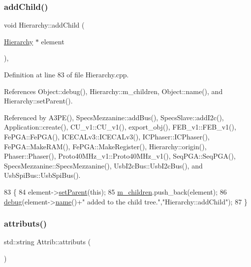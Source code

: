 \subsubsection{\texorpdfstring{add\+Child()}{addChild()}}
{\footnotesize\ttfamily void Hierarchy\+::add\+Child (\begin{DoxyParamCaption}\item[{\hyperlink{classHierarchy}{Hierarchy} $\ast$}]{element }\end{DoxyParamCaption})\hspace{0.3cm}{\ttfamily [virtual]}, {\ttfamily [inherited]}}



Definition at line 83 of file Hierarchy.\+cpp.



References Object\+::debug(), Hierarchy\+::m\+\_\+children, Object\+::name(), and Hierarchy\+::set\+Parent().



Referenced by A3\+P\+E(), Specs\+Mezzanine\+::add\+Bus(), Specs\+Slave\+::add\+I2c(), Application\+::create(), C\+U\+\_\+v1\+::\+C\+U\+\_\+v1(), export\+\_\+obj(), F\+E\+B\+\_\+v1\+::\+F\+E\+B\+\_\+v1(), Fe\+P\+G\+A\+::\+Fe\+P\+G\+A(), I\+C\+E\+C\+A\+Lv3\+::\+I\+C\+E\+C\+A\+Lv3(), I\+C\+Phaser\+::\+I\+C\+Phaser(), Fe\+P\+G\+A\+::\+Make\+R\+A\+M(), Fe\+P\+G\+A\+::\+Make\+Register(), Hierarchy\+::origin(), Phaser\+::\+Phaser(), Proto40\+M\+Hz\+\_\+v1\+::\+Proto40\+M\+Hz\+\_\+v1(), Seq\+P\+G\+A\+::\+Seq\+P\+G\+A(), Specs\+Mezzanine\+::\+Specs\+Mezzanine(), Usb\+I2c\+Bus\+::\+Usb\+I2c\+Bus(), and Usb\+Spi\+Bus\+::\+Usb\+Spi\+Bus().


\begin{DoxyCode}
83                                           \{
84   element->\hyperlink{classHierarchy_a585ad1aeec16077a0e532ab8b4fc557b}{setParent}(\textcolor{keyword}{this});
85   \hyperlink{classHierarchy_a038816763941fd4a930504917f60483b}{m\_children}.push\_back(element);
86   \hyperlink{classObject_aac010553f022165573714b7014a15f0d}{debug}(element->\hyperlink{classObject_a300f4c05dd468c7bb8b3c968868443c1}{name}()+\textcolor{stringliteral}{" added to the child tree."},\textcolor{stringliteral}{"Hierarchy::addChild"});
87 \}
\end{DoxyCode}
\mbox{\label{classAttrib_aee7bbf16b144887f196e1341b24f8a26}} 
\subsubsection{\texorpdfstring{attributs()}{attributs()}}
{\footnotesize\ttfamily std\+::string Attrib\+::attributs (\begin{DoxyParamCaption}{ }\end{DoxyParamCaption})\hspace{0.3cm}{\ttfamily [inherited]}}

